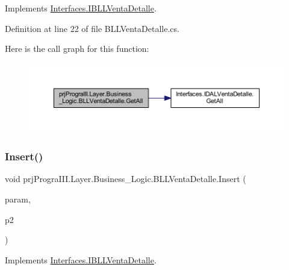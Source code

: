 Implements \hyperlink{interface_interfaces_1_1_i_b_l_l_venta_detalle_af009e6d0db3ad9f1adf7ea8e00efc7f6}{Interfaces.\+I\+B\+L\+L\+Venta\+Detalle}.



Definition at line 22 of file B\+L\+L\+Venta\+Detalle.\+cs.

Here is the call graph for this function\+:
\nopagebreak
\begin{figure}[H]
\begin{center}
\leavevmode
\includegraphics[width=350pt]{classprj_progra_i_i_i_1_1_layer_1_1_business___logic_1_1_b_l_l_venta_detalle_a27f26563248d0c13754d69442e6f7a0a_cgraph}
\end{center}
\end{figure}
\hypertarget{classprj_progra_i_i_i_1_1_layer_1_1_business___logic_1_1_b_l_l_venta_detalle_a5d13037ef7919552e90d8f6a50862db4}{}\label{classprj_progra_i_i_i_1_1_layer_1_1_business___logic_1_1_b_l_l_venta_detalle_a5d13037ef7919552e90d8f6a50862db4} 
\subsubsection{\texorpdfstring{Insert()}{Insert()}}
{\footnotesize\ttfamily void prj\+Progra\+I\+I\+I.\+Layer.\+Business\+\_\+\+Logic.\+B\+L\+L\+Venta\+Detalle.\+Insert (\begin{DoxyParamCaption}\item[{\hyperlink{classprj_progra_i_i_i_1_1_layer_1_1_entities_1_1_venta_detalle}{Venta\+Detalle}}]{param,  }\item[{int}]{p2 }\end{DoxyParamCaption})}



Implements \hyperlink{interface_interfaces_1_1_i_b_l_l_venta_detalle_a3025cdae5e97d2097996fec8f11de409}{Interfaces.\+I\+B\+L\+L\+Venta\+Detalle}.



